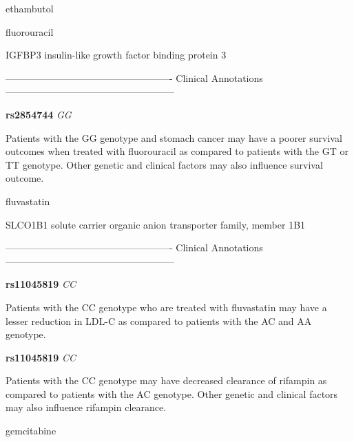 \documentclass{resume} %
\begin{document}
\begin{rSection}{ ethambutol }
\end{rSection}\begin{rSection}{ fluorouracil }
\item[]

\begin{rSubsection}{ IGFBP3 }{ insulin-like growth factor binding protein 3 }{}{}
\item[]

\item[] ---------------------------------------------------- Clinical Annotations -----------------------------------------------------\newline
\item \textbf{ rs2854744 } \textit{ GG }
\item[] Patients with the GG genotype and stomach cancer may have a poorer survival outcomes when treated with fluorouracil as compared to patients with the GT or TT genotype. Other genetic and clinical factors may also influence survival outcome.
\end{rSubsection}

\end{rSection}\begin{rSection}{ fluvastatin }
\item[]

\begin{rSubsection}{ SLCO1B1 }{ solute carrier organic anion transporter family, member 1B1 }{}{}
\item[]

\item[] ---------------------------------------------------- Clinical Annotations -----------------------------------------------------\newline
\item \textbf{ rs11045819 } \textit{ CC }
\item[] Patients with the CC genotype who are treated with fluvastatin may have a lesser reduction in LDL-C as compared to patients with the AC and AA genotype.\item \textbf{ rs11045819 } \textit{ CC }
\item[] Patients with the CC genotype may have decreased clearance of rifampin as compared to patients with the AC genotype. Other genetic and clinical factors may also influence rifampin clearance. 
\end{rSubsection}

\end{rSection}\begin{rSection}{ gemcitabine }
\item[]


\end{rSection}
\end{document}
